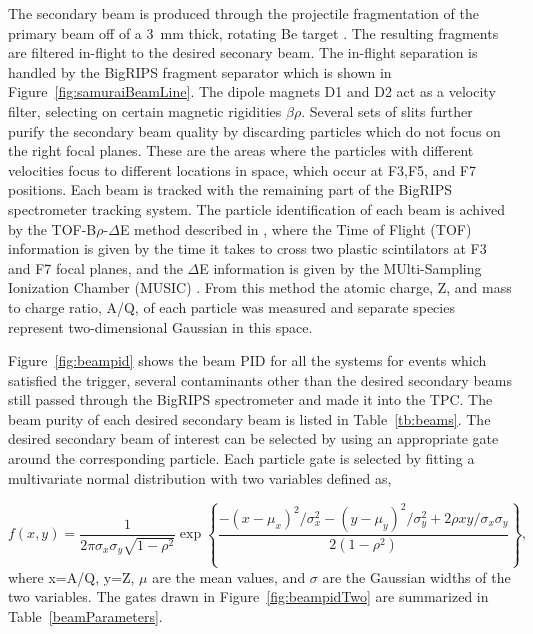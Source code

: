 The secondary beam is produced through the projectile fragmentation of the primary beam off of a \SI{3}{\milli\metre} thick, rotating Be target \cite{inflightsep}. The resulting fragments are filtered in-flight to the desired seconary beam. The in-flight separation is handled by the BigRIPS fragment separator which is shown in Figure~\ref{fig:samuraiBeamLine}. The dipole magnets D1 and D2 act as a velocity filter, selecting on certain magnetic rigidities $\beta\rho$. Several sets of slits further purify the secondary beam quality by discarding particles which do not focus on the right focal planes. These are the areas where the particles with different velocities focus to different locations in space, which occur at F3,F5, and F7 positions.  Each beam is tracked with the remaining part of the BigRIPS spectrometer tracking system. The particle identification of each beam is achived by the TOF-B$\rho$-$\Delta$E method described in \cite{bigrips}, where the Time of Flight (TOF) information is given by the time it takes to cross two plastic scintilators at F3 and F7 focal planes, and the $\Delta$E information is given by the MUlti-Sampling Ionization Chamber (MUSIC) \cite{music}. From this method the atomic charge, Z, and mass to charge ratio, A/Q, of each particle was measured and separate species represent two-dimensional Gaussian in this space. 

Figure~\ref{fig:beampid} shows the beam PID for all the systems for events which satisfied the trigger, several contaminants other than the desired secondary beams still passed through the BigRIPS spectrometer and made it into the TPC. The beam purity of each desired secondary beam is listed in Table~\ref{tb:beams}. The desired secondary beam of interest can be selected by using an appropriate gate around the corresponding particle. Each particle gate is selected by fitting a multivariate normal distribution with two variables defined as,

\begin{equation}
  f(x,y)=\frac1{2\pi\sigma_x\sigma_y\sqrt{1-\rho^2}}\exp\left\{
  \frac{-(x - \mu_{x})^2/\sigma_x^2-(y-\mu_{y})^2/\sigma_y^2+2\rho
  xy/\sigma_x\sigma_y}{2(1-\rho^2)}\right\},
   \label{multiGauss}
\end{equation}
where x=A/Q, y=Z, $\mu$ are the mean values, and $\sigma$ are the Gaussian widths of the two variables. The gates drawn in Figure~\ref{fig:beampidTwo} are summarized in Table~\ref{beamParameters}. 


